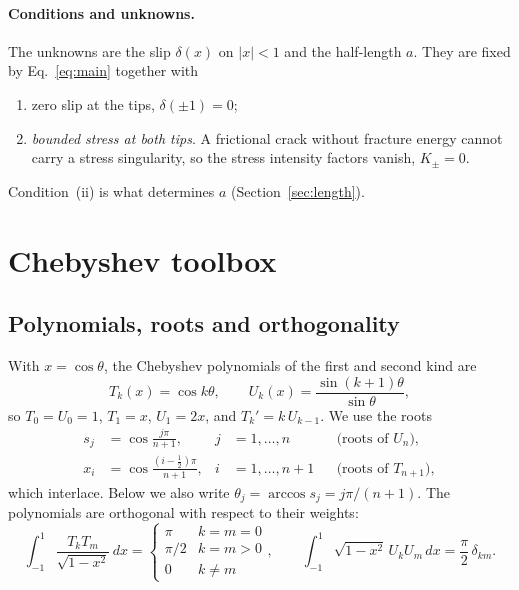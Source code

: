 \documentclass[12pt]{article}
\begin{document}
\paragraph{Conditions and unknowns.} The unknowns are the slip $\delta(x)$ on
$|x|<1$ and the half-length $a$. They are fixed by Eq.~\eqref{eq:main} together with
\begin{enumerate}
	\item zero slip at the tips, $\delta(\pm1)=0$;
	\item \emph{bounded stress at both tips}. A frictional crack without
	      fracture energy cannot carry a stress singularity, so the stress
	      intensity factors vanish, $K_\pm = 0$.
\end{enumerate}
Condition~(ii) is what determines $a$ (Section~\ref{sec:length}).

\section{Chebyshev toolbox}\label{sec:toolbox}

\subsection{Polynomials, roots and orthogonality}
With $x = \cos\theta$, the Chebyshev polynomials of the first and second kind are
\begin{equation*}
	T_k(x) = \cos k\theta, \qquad
	U_k(x) = \frac{\sin(k+1)\theta}{\sin\theta},
\end{equation*}
so $T_0 = U_0 = 1$, $T_1 = x$, $U_1 = 2x$, and $T_k' = k\,U_{k-1}$. We use the roots
\begin{align}
	s_j & = \cos\frac{j\pi}{n+1},       & j & = 1,\dots,n   &   & \text{(roots of } U_n),
	\label{eq:sj}                                                                         \\
	x_i & = \cos\frac{(i-\frac12)\pi}{n+1}, & i & = 1,\dots,n+1 &   & \text{(roots of } T_{n+1}),
	\label{eq:xi}
\end{align}
which interlace. Below we also write $\theta_j = \arccos s_j = j\pi/(n+1)$. The
polynomials are orthogonal with respect to their weights:
\begin{equation*}
	\int_{-1}^{1}\frac{T_kT_m}{\sqrt{1-x^2}}\,dx =
	\begin{cases} \pi & k=m=0 \\ \pi/2 & k=m>0 \\ 0 & k\neq m \end{cases},
	\qquad
	\int_{-1}^{1}\sqrt{1-x^2}\,U_kU_m\,dx = \frac{\pi}{2}\,\delta_{km}.
\end{equation*}
\end{document}
